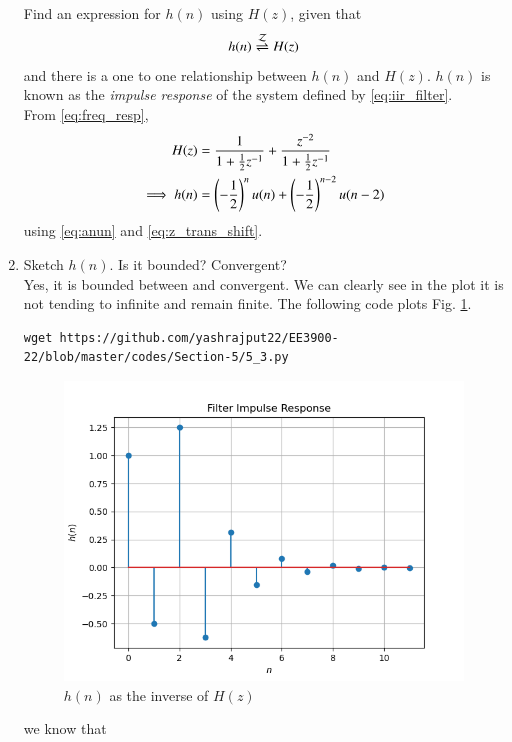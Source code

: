 \documentclass[journal,12pt,twocolumn]{IEEEtran}
\renewcommand\thesection{\arabic{section}}
\begin{document}
\begin{enumerate}[label=\thesection.\arabic*]
Find an expression for $h(n)$ using $H(z)$, given that 
\begin{equation}
\label{eq:impulse_resp}
h(n) \overset{\mathcal{Z}}{ \rightleftharpoons} H(z)
\end{equation}
and there is a one to one relationship between $h(n)$ and $H(z)$. $h(n)$ is known as the {\em impulse response} of the
system defined by \eqref{eq:iir_filter}.
\\
\solution From \eqref{eq:freq_resp},
\begin{align}
H(z) &= \frac{1}{1 + \frac{1}{2}z^{-1}} + \frac{ z^{-2}}{1 + \frac{1}{2}z^{-1}}
\\
\implies h(n) &= \left(-\frac{1}{2}\right)^{n}u(n) + \left(-\frac{1}{2}\right)^{n-2}u(n-2)
\end{align}
using \eqref{eq:anun} and \eqref{eq:z_trans_shift}.
\item Sketch $h(n)$. Is it bounded? Convergent? 
\\
\solution Yes, it is bounded between and convergent. We can clearly see in the plot it is not tending to infinite and remain finite.
The following code plots Fig. \ref{fig:hn}.
\begin{lstlisting}
wget https://github.com/yashrajput22/EE3900-22/blob/master/codes/Section-5/5_3.py
\end{lstlisting}
\begin{figure}[!ht]
\centering
\includegraphics[width=\columnwidth]{./figs/5_2}
\caption{$h(n)$ as the inverse of $H(z)$}
\label{fig:hn}
\end{figure}
we know that\\
\begin{equation}

\end{equation}
\end{enumerate}
\end{document}
